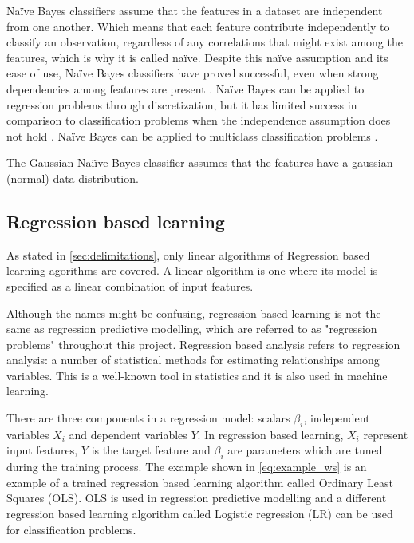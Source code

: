 	Naïve Bayes classifiers assume that the features in a dataset are independent from one another. Which means that each feature contribute independently to classify an observation, regardless of any correlations that might exist among the features, which is why it is called naïve. Despite this naïve assumption and its ease of use, Naïve Bayes classifiers have proved successful, even when strong dependencies among features are present \cite{ARTICLE:13, IP:4}. Naïve Bayes can be applied to regression problems through discretization, but it has limited success in comparison to classification problems when the independence assumption does not hold \cite{ARTICLE:14}. Naïve Bayes can be applied to multiclass classification problems \cite{ARTICLE:17}. 

	The Gaussian Naiïve Bayes classifier assumes that the features have a gaussian (normal) data distribution.
	 
	\subsection{Regression based learning} \label{sec:reg_based_learning}
		As stated in \ref{sec:delimitations}, only linear algorithms of Regression based learning agorithms are covered. A linear algorithm is one where its model is specified as a linear combination of input features.  

		Although the names might be confusing, regression based learning is not the same as regression predictive modelling, which are referred to as "regression problems" throughout this project. Regression based analysis refers to regression analysis: a number of statistical methods for estimating relationships among variables. This is a well-known tool in statistics and it is also used in machine learning. 

		There are three components in a regression model: scalars $\beta_i$, independent variables $X_i$ and dependent variables $Y$. In regression based learning, $X_i$ represent input features, $Y$ is the target feature and $\beta_i$ are parameters which are tuned during the training process. The example shown in \ref{eq:example_ws} is an example of a trained regression based learning algorithm called Ordinary Least Squares (OLS). OLS is used in regression predictive modelling and a different regression based learning algorithm called Logistic regression (LR) can be used for classification problems. 

